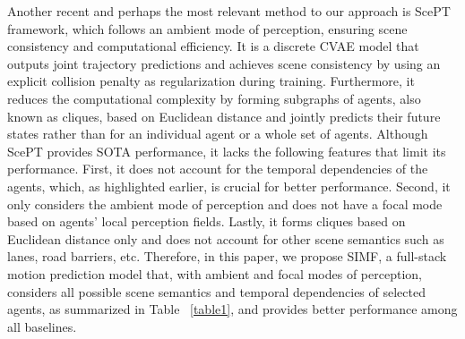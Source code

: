 \documentclass{article}
\begin{document}
Another recent and perhaps the most relevant method to our approach is ScePT \cite{chen2022scept} framework, which follows an ambient mode of perception, ensuring scene consistency and computational efficiency. It is a discrete CVAE model that outputs joint trajectory predictions and achieves scene consistency by using an explicit collision penalty as regularization during training. Furthermore, it reduces the computational complexity by forming subgraphs of agents, also known as cliques, based on Euclidean distance and jointly predicts their future states rather than for an individual agent or a whole set of agents. Although ScePT provides SOTA performance, it lacks the following features that limit its performance. First, it does not account for the temporal dependencies of the agents, which, as highlighted earlier, is crucial for better performance. Second, it only considers the ambient mode of perception and does not have a focal mode based on agents' local perception fields. Lastly, it forms cliques based on Euclidean distance only and does not account for other scene semantics such as lanes, road barriers, etc. Therefore, in this paper, we propose SIMF, a full-stack motion prediction model that, with ambient and focal modes of perception, considers all possible scene semantics and temporal dependencies of selected agents, as summarized in Table ~\ref{table1}, and provides better performance among all baselines.
\end{document}
